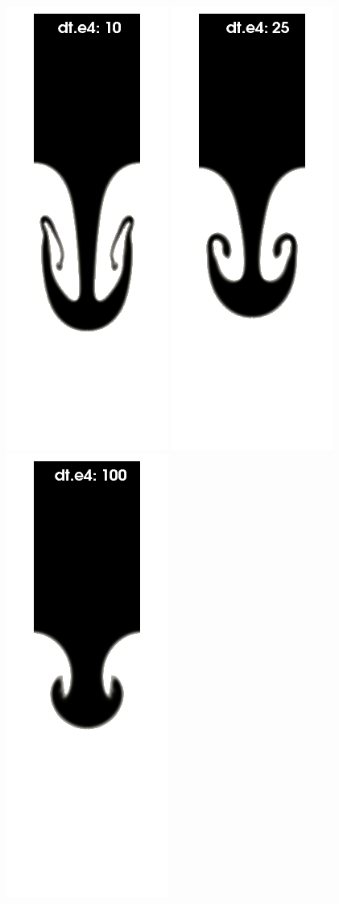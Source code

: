 \documentclass[a4paper,conference]{IEEEtran}
\begin{document}
\begin{figure}
  \begin{center}

      \includegraphics[width=.24\columnwidth]{images/rayleigh_foam_dts_A.jpg}
      \includegraphics[width=.24\columnwidth]{images/rayleigh_foam_dts_B.jpg}
      \includegraphics[width=.24\columnwidth]{images/rayleigh_foam_dts_C.jpg}

\end{center}
\end{figure}
\end{document}

